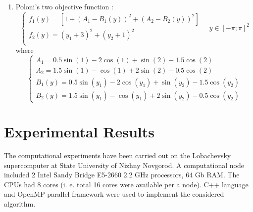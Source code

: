 \documentclass{llncs}
\begin{document}
\begin{enumerate}
  \item Poloni's two objective function \cite{Huband2006}:
    \begin{equation}
      \left \{
      \begin{array}{l}
        f_{1}\left(y\right) = \left[1 + \left(A_{1} - B_{1}\left(y\right) \right)^{2} + \left(A_{2} -
B_{2}\left(y\right) \right)^{2} \right] \\
        f_{2}\left(y\right) = \left(y_1 + 3\right)^{2} + \left(y_2 + 1 \right)^{2} \\
      \end{array}
      \right .
      \quad y\in [-\pi;\pi]^2
    \end{equation}
    where
    \begin{equation*}
      \begin{cases}
        A_{1} = 0.5 \sin \left(1\right) - 2 \cos \left(1\right) + \sin \left(2\right) - 1.5 \cos
\left(2\right)  \\
        A_{2} = 1.5 \sin \left(1\right) - \cos \left(1\right) + 2 \sin \left(2\right) - 0.5 \cos
\left(2\right)  \\
        B_{1}\left(y\right) = 0.5 \sin \left(y_1\right) - 2 \cos \left(y_1\right) + \sin \left(y_2\right) -
1.5 \cos \left(y_2\right)  \\
        B_{2}\left(y\right) = 1.5 \sin \left(y_1\right) - \cos \left(y_1\right) + 2 \sin \left(y_2\right) -
0.5 \cos \left(y_2\right)
      \end{cases}
    \end{equation*}
\end{enumerate}
\section{Experimental Results}
The computational experiments have been carried out on the Lobachevsky supercomputer at
State University of Nizhny Novgorod. A computational node included 2 Intel
Sandy Bridge E5-2660 2.2 GHz processors, 64 Gb RAM. The CPUs had 8 cores (i. e. total 16 cores
were available per a node). C++ language and OpenMP parallel framework were used to implement the considered algorithm.
\end{document}
